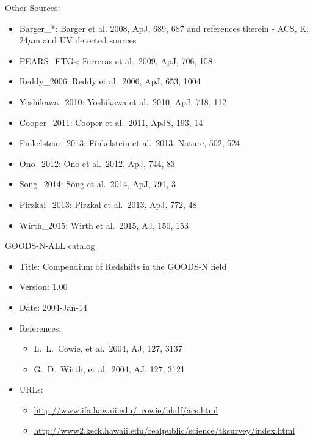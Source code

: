 \documentclass[12pt,onecolumn]{article}
\begin{document}
\noindent Other Sources:
\begin{itemize}
\item Barger\_*: Barger et al. 2008, ApJ, 689, 687 and references therein - ACS, K, 24$\mu\mathrm{m}$ and UV detected sources
\item PEARS\_ETGs: Ferreras et al.\ 2009, ApJ, 706, 158              %
\item Reddy\_2006: Reddy et al.\ 2006, ApJ, 653, 1004
\item Yoshikawa\_2010: Yoshikawa et al.\ 2010, ApJ, 718, 112         %
\item Cooper\_2011: Cooper et al.\ 2011, ApJS, 193, 14               %
\item Finkelstein\_2013: Finkelstein et al.\ 2013, Nature, 502, 524  %
\item Ono\_2012: Ono et al.\ 2012, ApJ, 744, 83                      %
\item Song\_2014: Song et al.\ 2014, ApJ, 791, 3                     %
\item Pirzkal\_2013: Pirzkal et al.\ 2013, ApJ, 772, 48              %
\item Wirth\_2015: Wirth et al.\ 2015, AJ, 150, 153                  %
\end{itemize}


\noindent GOODS-N-ALL catalog
\begin{itemize}
\item Title:	Compendium of Redshifts in the GOODS-N field
\item Version:	1.00
\item Date:	2004-Jan-14
\item References:
    \begin{itemize}
        \item L.\ L.\ Cowie, et al.\ 2004, AJ, 127, 3137
	    \item G.\ D.\ Wirth, et al.\ 2004, AJ, 127, 3121
    \end{itemize}
\item URLs:
    \begin{itemize}
        \item \href{http://www.ifa.hawaii.edu/~cowie/hhdf/acs.html}{http://www.ifa.hawaii.edu/~cowie/hhdf/acs.html}
        \item \href{http://www2.keck.hawaii.edu/realpublic/science/tksurvey/index.html}{http://www2.keck.hawaii.edu/realpublic/science/tksurvey/index.html}
    \end{itemize}
\end{itemize}
\end{document}
